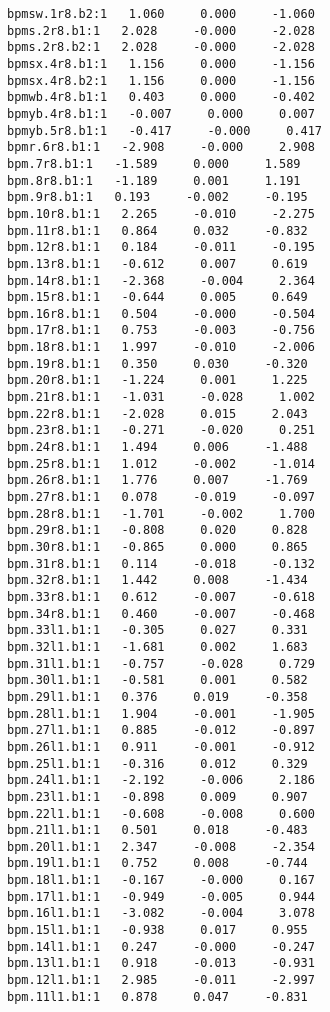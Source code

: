 \begin{verbatim}
bpmsw.1r8.b2:1   1.060     0.000     -1.060
bpms.2r8.b1:1   2.028     -0.000     -2.028
bpms.2r8.b2:1   2.028     -0.000     -2.028
bpmsx.4r8.b1:1   1.156     0.000     -1.156
bpmsx.4r8.b2:1   1.156     0.000     -1.156
bpmwb.4r8.b1:1   0.403     0.000     -0.402
bpmyb.4r8.b1:1   -0.007     0.000     0.007
bpmyb.5r8.b1:1   -0.417     -0.000     0.417
bpmr.6r8.b1:1   -2.908     -0.000     2.908
bpm.7r8.b1:1   -1.589     0.000     1.589
bpm.8r8.b1:1   -1.189     0.001     1.191
bpm.9r8.b1:1   0.193     -0.002     -0.195
bpm.10r8.b1:1   2.265     -0.010     -2.275
bpm.11r8.b1:1   0.864     0.032     -0.832
bpm.12r8.b1:1   0.184     -0.011     -0.195
bpm.13r8.b1:1   -0.612     0.007     0.619
bpm.14r8.b1:1   -2.368     -0.004     2.364
bpm.15r8.b1:1   -0.644     0.005     0.649
bpm.16r8.b1:1   0.504     -0.000     -0.504
bpm.17r8.b1:1   0.753     -0.003     -0.756
bpm.18r8.b1:1   1.997     -0.010     -2.006
bpm.19r8.b1:1   0.350     0.030     -0.320
bpm.20r8.b1:1   -1.224     0.001     1.225
bpm.21r8.b1:1   -1.031     -0.028     1.002
bpm.22r8.b1:1   -2.028     0.015     2.043
bpm.23r8.b1:1   -0.271     -0.020     0.251
bpm.24r8.b1:1   1.494     0.006     -1.488
bpm.25r8.b1:1   1.012     -0.002     -1.014
bpm.26r8.b1:1   1.776     0.007     -1.769
bpm.27r8.b1:1   0.078     -0.019     -0.097
bpm.28r8.b1:1   -1.701     -0.002     1.700
bpm.29r8.b1:1   -0.808     0.020     0.828
bpm.30r8.b1:1   -0.865     0.000     0.865
bpm.31r8.b1:1   0.114     -0.018     -0.132
bpm.32r8.b1:1   1.442     0.008     -1.434
bpm.33r8.b1:1   0.612     -0.007     -0.618
bpm.34r8.b1:1   0.460     -0.007     -0.468
bpm.33l1.b1:1   -0.305     0.027     0.331
bpm.32l1.b1:1   -1.681     0.002     1.683
bpm.31l1.b1:1   -0.757     -0.028     0.729
bpm.30l1.b1:1   -0.581     0.001     0.582
bpm.29l1.b1:1   0.376     0.019     -0.358
bpm.28l1.b1:1   1.904     -0.001     -1.905
bpm.27l1.b1:1   0.885     -0.012     -0.897
bpm.26l1.b1:1   0.911     -0.001     -0.912
bpm.25l1.b1:1   -0.316     0.012     0.329
bpm.24l1.b1:1   -2.192     -0.006     2.186
bpm.23l1.b1:1   -0.898     0.009     0.907
bpm.22l1.b1:1   -0.608     -0.008     0.600
bpm.21l1.b1:1   0.501     0.018     -0.483
bpm.20l1.b1:1   2.347     -0.008     -2.354
bpm.19l1.b1:1   0.752     0.008     -0.744
bpm.18l1.b1:1   -0.167     -0.000     0.167
bpm.17l1.b1:1   -0.949     -0.005     0.944
bpm.16l1.b1:1   -3.082     -0.004     3.078
bpm.15l1.b1:1   -0.938     0.017     0.955
bpm.14l1.b1:1   0.247     -0.000     -0.247
bpm.13l1.b1:1   0.918     -0.013     -0.931
bpm.12l1.b1:1   2.985     -0.011     -2.997
bpm.11l1.b1:1   0.878     0.047     -0.831

\end{verbatim}
